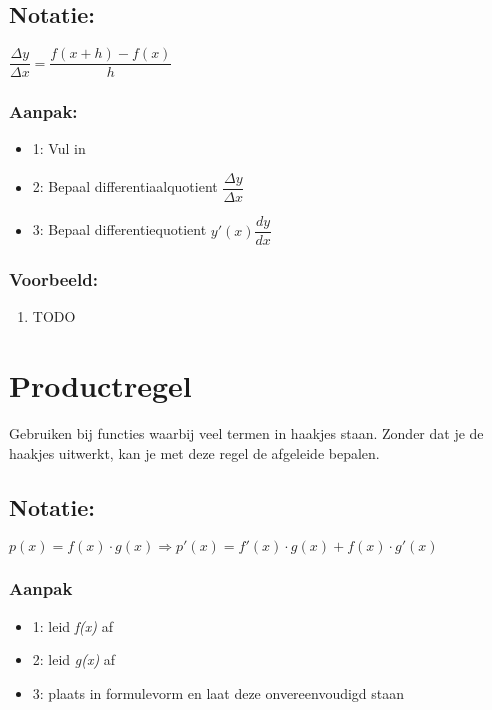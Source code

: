 \documentclass[11pt]{article}
\begin{document}
\subsection{Notatie:}
\label{sec:org4692fd5}
\(\dfrac{\Delta y}{\Delta x} = \dfrac{f(x+h) - f(x)}{h}\)
\subsubsection{Aanpak:}
\label{sec:orgfec14cc}
\begin{itemize}
\item 1: Vul in
\item 2: Bepaal differentiaalquotient \(\dfrac{\Delta y}{\Delta x}\)
\item 3: Bepaal differentiequotient \(y'(x) \dfrac{dy}{dx}\)
\end{itemize}
\subsubsection{Voorbeeld:}
\label{sec:org60251be}
\begin{enumerate}
\item TODO
\label{sec:org16dcd6f}
\end{enumerate}


\section{Productregel}
\label{sec:orga84dc42}
Gebruiken bij functies waarbij veel termen in haakjes staan.
Zonder dat je de haakjes uitwerkt, kan je met deze regel de afgeleide bepalen.
\subsection{Notatie:}
\label{sec:org4116a33}
\(p(x) = f(x) \cdot g(x) \Rightarrow p'(x) = f'(x) \cdot g(x) + f(x) \cdot g'(x)\)
\subsubsection{Aanpak}
\label{sec:orgf8676a9}
\begin{itemize}
\item 1: leid \textit{f(x)} af
\item 2: leid \textit{g(x)} af
\item 3: plaats in formulevorm en laat deze onvereenvoudigd staan
\end{itemize}
\end{document}
